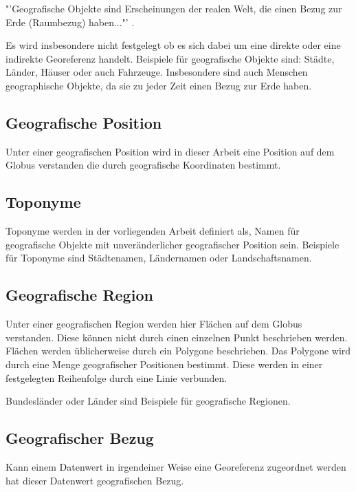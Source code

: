 			"'Geografische Objekte sind Erscheinungen der realen Welt, die einen Bezug zur Erde (Raumbezug) haben..."' \cite{ISO19110:2005}.

			Es wird insbesondere nicht festgelegt ob es sich dabei um eine direkte oder eine indirekte Georeferenz handelt.
			Beispiele für geografische Objekte sind: Städte, Länder, Häuser oder auch Fahrzeuge.
			Insbesondere sind auch Menschen geographische Objekte, da sie zu jeder Zeit einen Bezug zur Erde haben.


		\subsection{Geografische Position}
		
			Unter einer geografischen Position wird in dieser Arbeit eine Position auf dem Globus verstanden die durch geografische Koordinaten bestimmt.

		\subsection{Toponyme}  
			
			Toponyme werden in der vorliegenden Arbeit definiert als, Namen für geografische Objekte mit unveränderlicher geografischer Position sein.
			Beispiele für Toponyme sind Städtenamen, Ländernamen oder Landschaftsnamen.  

		\subsection{Geografische Region} 
			
			Unter einer geografischen Region werden hier Flächen auf dem Globus verstanden.
			Diese können nicht durch einen einzelnen Punkt beschrieben werden. 
			Flächen werden üblicherweise durch ein Polygone beschrieben. 
			Das Polygone wird durch eine Menge geografischer Positionen bestimmt.
			Diese werden in einer festgelegten Reihenfolge durch eine Linie verbunden.

			Bundesländer oder Länder sind Beispiele für geografische Regionen.
			
		\subsection{Geografischer Bezug} 

			Kann einem Datenwert in irgendeiner Weise eine Georeferenz zugeordnet werden hat dieser Datenwert geografischen Bezug.

